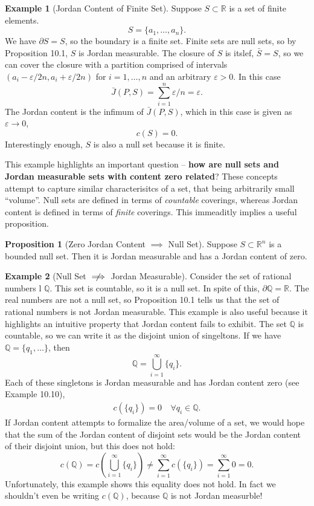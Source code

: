 \documentclass{article}
\newcommand{\R}{\mathbb{R}}
\newcommand{\Q}{\mathbb{Q}}
\theoremstyle{definition}
\newtheorem{proposition}{Proposition}[section]
\newtheorem{example}{Example}[section]
\begin{document}
\begin{example}[Jordan Content of Finite Set]
	Suppose $S \subset \R$ is a set of finite elements. $$S = \{a_1,\ldots, a_n\}.$$ We have $\partial S = S$, so the boundary is a finite set. Finite sets are null sets, so by Proposition 10.1, $S$ is Jordan measurable. The closure of $S$ is itslef, $\bar S = S$, so we can cover the closure with a partition comprised of intervals $(a_i - \varepsilon/2n, a_i + \varepsilon/2n)$ for $i = 1,\ldots, n$ and an arbitrary $\varepsilon > 0$. In this case 
	$$ \bar J(P,S) = \sum_{i = 1}^{n}\varepsilon/n = \varepsilon .$$ The Jordan content is the infimum of $\bar J(P,S)$, which in this case is given as $\varepsilon \to 0$,
	 $$ c(S) = 0.$$ Interestingly enough, $S$ is also a null set because it is finite. 
\end{example}

This example highlights an important question -- \textbf{how are null sets and Jordan measurable sets with content zero related}? These concepts attempt to capture similar characterisitcs of a set, that being arbitrarily small ``volume''. Null sets are defined in terms of \textit{countable} coverings, whereas Jordan content is defined in terms of \textit{finite} coverings. This immeaditly implies a useful proposition.

\begin{proposition}[Zero Jordan Content $\implies$ Null Set]
	Suppose $S\subset \R^n$ is a bounded null set. Then it is Jordan measurable and has a Jordan content of zero. 
\end{proposition}

\begin{example}[Null Set $\centernot\implies$ Jordan Measurable]
Consider the set of rational numbers l $\Q$. This set is countable, so it is a null set. In spite of this, $\partial\Q = \R$. The real numbers are not a null set, so Proposition 10.1 tells us that the set of rational numbers is not Jordan measurable. This example is also useful because it highlights an intuitive property that Jordan content fails to exhibit. The set $\Q$ is countable, so we can write it as the disjoint union of singeltons. If we have $\Q = \{q_1,\ldots\}$, then
$$ \Q = \bigcup_{i=1}^\infty \{q_i\}.$$  Each of these singletons is Jordan measurable and has Jordan content zero (see Example 10.10), 
\begin{align*}
	c\left(\{q_i\}\right) = 0 &\ \forall q_i\in \Q.
\end{align*}
If Jordan content attempts to formalize the area/volume of a set, we would hope that the sum of the Jordan content of disjoint sets would be the Jordan content of their disjoint union, but this does not hold:
$$ c(\Q) = c\left( \bigcup_{i=1}^\infty \{q_i\} \right) \neq \sum_{i=1}^{\infty} c\left(\{q_i\}\right) = \sum_{i = 1}^{\infty}0=0.$$ Unfortunately, this example shows this equality does not hold. In fact we shouldn't even be writing $c(\Q)$, because $\Q$ is not Jordan measurble!
\end{example}	
\end{document}
